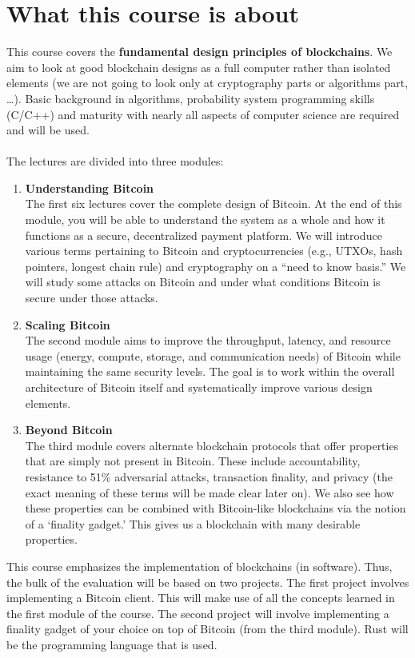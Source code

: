 \section{What this course is about}
This course covers the \textbf{fundamental design principles of blockchains}. We aim to look at good blockchain designs as a full computer rather than isolated elements (we are not going to look only at cryptography parts or algorithms part, …).
Basic background in algorithms, probability system programming skills (C/C++) and maturity with nearly all aspects of computer science are required and will be used.\\\\
The lectures are divided into three modules:
\begin{enumerate}
	\item \textbf{Understanding Bitcoin}\\
	The first six lectures cover the complete design of Bitcoin. At the end of this module, you will be able to understand the system as a whole and how it functions as a	secure, decentralized payment platform. We will introduce various terms pertaining to Bitcoin and cryptocurrencies (e.g., UTXOs, hash pointers, longest chain rule) and cryptography on a “need to	know basis.” We will study some attacks on Bitcoin and under what conditions Bitcoin is secure under those attacks.
	\item \textbf{Scaling Bitcoin}\\
	The second module aims to improve the throughput, latency, and resource usage
	(energy, compute, storage, and communication needs) of Bitcoin while maintaining the same security
	levels. The goal is to work within the overall architecture of Bitcoin itself and systematically improve
	various design elements.
	\item \textbf{Beyond Bitcoin}\\
	The third module covers alternate blockchain protocols that offer properties
	that are simply not present in Bitcoin. These include accountability, resistance to 51\% adversarial
	attacks, transaction finality, and privacy (the exact meaning of these terms will be made clear later
	on). We also see how these properties can be combined with Bitcoin-like blockchains via the notion
	of a ‘finality gadget.’ This gives us a blockchain with many desirable properties.
\end{enumerate}
This course emphasizes the implementation of blockchains (in software).
Thus, the bulk of the evaluation will be based on two projects. The first project involves implementing
a Bitcoin client. This will make use of all the concepts learned in the first module of the course.
The second project will involve implementing a finality gadget of your choice on top of Bitcoin (from
the third module). Rust will be the programming language that is used.

